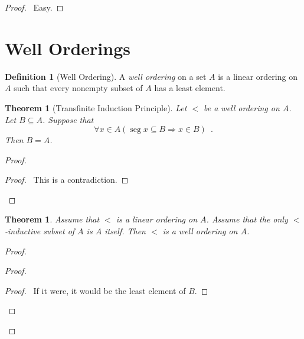 \documentclass{article}
\let\qed\relax
\newtheorem{theorem}[axiom]{Theorem}
\theoremstyle{definition}
\newtheorem{definition}[axiom]{Definition}
\newcommand{\seg}{\ensuremath{\operatorname{seg}}}
\begin{document}
    \begin{proof}
        \pf\ Easy. \qed
    \end{proof}

    \section{Well Orderings}

    \begin{definition}[Well Ordering]
        A \emph{well ordering} on a set $A$ is a linear ordering on $A$ such that every nonempty subset of
        $A$ has a least element.
    \end{definition}

    \begin{theorem}[Transfinite Induction Principle]
        Let $<$ be a well ordering on $A$. Let $B \subseteq A$. Suppose that
        \[ \forall x \in A (\seg x \subseteq B \Rightarrow x \in B) \enspace . \]
        Then $B = A$.
    \end{theorem}

    \begin{proof}
        \pf
        \step{3}{$\seg t \subseteq B$}
        \qedstep
        \begin{proof}
            \pf\ This is a contradiction.
        \end{proof}
        \qed
    \end{proof}

    \begin{theorem}
        Assume that $<$ is a linear ordering on $A$. Assume that the only $<$-inductive subset of $A$ is $A$
        itself. Then $<$ is a well ordering on $A$.
    \end{theorem}

    \begin{proof}
        \pf
        \begin{proof}
            \step{b}{\assume{$\seg t \subseteq A - B$}}
            \begin{proof}
                \pf\ If it were, it would be the least element of $B$.
            \end{proof}
        \end{proof}
        \qed
    \end{proof}
\end{document}
